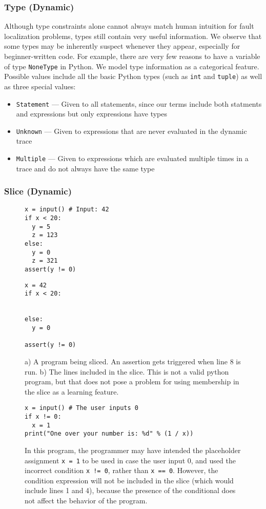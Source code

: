 \documentclass[conference]{IEEEtran}
\newcommand\lt[1]{{\lstinline|#1|}}
\begin{document}
\subsubsection{Type (Dynamic)}

Although type constraints alone cannot always match human intuition for 
fault localization problems, types still contain very useful information.
We observe that some types may be inherently suspect whenever they appear,
especially for beginner-written code. For example, there are very few
reasons to have a variable of type \lt{NoneType} in Python. We model
type information as a categorical feature. Possible
values include all the basic Python types (such as \lt{int}
and \lt{tuple}) as well as three special values:
\begin{itemize}
    \item \lt{Statement} --- Given to all statements, since our terms
    include both statments and expressions but only expressions 
    have types
    \item \lt{Unknown} --- Given to expressions that are never evaluated in the dynamic
    trace
    \item \lt{Multiple} --- Given to expressions which are evaluated multiple times in
    a trace and do not always have the same type
\end{itemize}

\subsubsection{Slice (Dynamic)}

\begin{figure}
\begin{lstlisting}
x = input() # Input: 42
if x < 20:
  y = 5
  z = 123
else:
  y = 0
  z = 321
assert(y != 0)
\end{lstlisting}
\begin{lstlisting}
x = 42
if x < 20:


else:
  y = 0

assert(y != 0)
\end{lstlisting}
\caption{
  a) A program being sliced. An assertion gets triggered when line 8 is run. b)
  The lines included in the slice. This is not a valid python
  program, but that does not pose a problem for using membership in the slice as
  a learning feature.
}
\label{fig-slice-example}
\end{figure}

\begin{figure}
\begin{lstlisting}
x = input() # The user inputs 0
if x != 0:
  x = 1
print("One over your number is: %d" % (1 / x))
\end{lstlisting}
\caption{In this program, the programmer may have intended the placeholder
  assignment \lt{x = 1} to be used in case the user input 0, and used the
  incorrect condition \lt{x != 0}, rather than \lt{x == 0}. However, the
  condition expression will not be included in the slice (which would include
  lines 1 and 4), because the presence of
  the conditional does not affect the behavior of the program.
}
\label{fig-slice-downside-example}
\end{figure}
\end{document}
